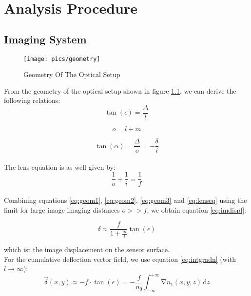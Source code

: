\chapter{Analysis Procedure}\label{sec:methodofattack}


\section{Imaging System}

\begin{figure}[H]
\texttt{[image: pics/geometry]}
\caption{Geometry Of The Optical Setup}
\label{pic:geometry}
\end{figure}


From the geometry of the optical setup shown in figure \ref{pic:geometry}, we can derive the following relations:
\\
\begin{equation}
\tan(\epsilon)=\frac{\Delta}{l}
\label{eq:geom1}
\end{equation}

\begin{equation}
o=l+m
\label{eq:geom2}
\end{equation}

\begin{equation}
\tan(\alpha)=\frac{\Delta}{o}=-\frac{\delta}{i}
\label{eq:geom3}
\end{equation}\\

The lens equation is as well given by:
\\
\begin{equation}
\frac{1}{o}+\frac{1}{i}=\frac{1}{f}
\label{eq:lenseq}
\end{equation}\\

Combining equations \ref{eq:geom1}, \ref{eq:geom2}, \ref{eq:geom3} and \ref{eq:lenseq} using the limit for large image imaging distances $o>>f$, we obtain equation \ref{eq:imdispl}:

\begin{equation}
\delta \approx \frac{f}{1+ \frac{m}{l}} \tan(\epsilon)
\label{eq:imdispl}
\end{equation}

which ist the image displacement on the sensor surface.
\\

For the cumulative deflection vector field, we use equation \ref{eq:intgradn} (with $l \rightarrow \infty$):
\\
\begin{equation}
\vec{\delta}(x,y)\approx -f \cdot \tan(\epsilon)=- \frac{f}{n_0}\int_{-\infty}^{+\infty} \mathrm \nabla n_1(x,y,z)\,\mathrm dz
\label{eq:intgradn}
\end{equation}



